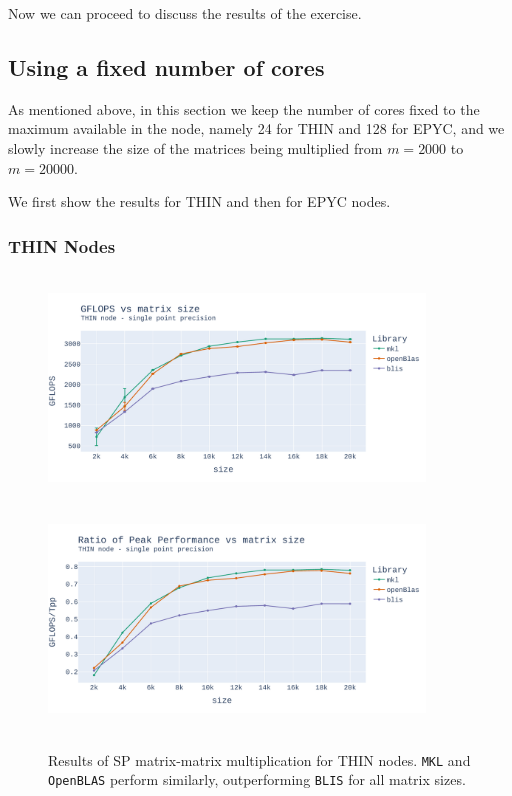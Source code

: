 \documentclass{report}
\begin{document}
Now we can proceed to discuss the results of the exercise.

\subsection{Using a fixed number of cores}

As mentioned above, in this section we keep the number of cores fixed to the 
maximum available in the node, namely 24 for THIN and 128 for EPYC, and we 
slowly increase the size of the matrices being multiplied from $m=2000$ to 
$m=20000$. 

We first show the results for THIN and then for EPYC nodes.

\subsubsection{THIN Nodes}

\begin{figure}[H]
\hspace*{-2.5cm}
\includegraphics[width=10cm, height=6cm]{./images/fixed_cores_thin_float_gflops.pdf}
\includegraphics[width=10cm, height=6cm]{./images/fixed_cores_thin_float_gflops_ratio.pdf}
\caption{\label{fig:fixed_cores_thin_float} Results of SP matrix-matrix multiplication 
for THIN nodes. \texttt{MKL} and \texttt{OpenBLAS} perform similarly, outperforming 
\texttt{BLIS} for all matrix sizes.}
\end{figure}
\end{document}
